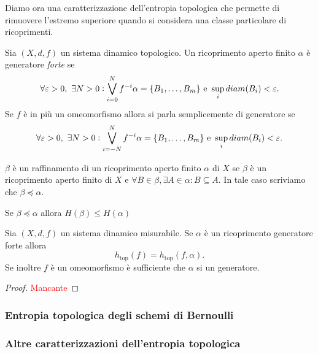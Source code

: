 Diamo ora una caratterizzazione dell'entropia topologica che permette di rimuovere l'estremo superiore quando si considera una classe particolare di ricoprimenti.

\begin{definition}[generatore]
    Sia $ (X, d, f) $ un sistema dinamico topologico. Un ricoprimento aperto finito $ \alpha $ è generatore \emph{forte} se
    \[
        \forall \varepsilon > 0, \ \exists N > 0 : \bigvee_{i=0}^{N}f^{-i}\alpha = \{B_1, \ldots, B_m\} \text{ e } \sup_{i} diam{(B_i)} < \varepsilon.
    \]
    Se $ f $ è in più un omeomorfismo allora si parla semplicemente di generatore se
    \[
        \forall \varepsilon > 0, \ \exists N > 0 : \bigvee_{i=-N}^{N}f^{-i}\alpha = \{B_1, \ldots, B_m\} \text{ e } \sup_{i} diam{(B_i)} < \varepsilon.
    \]
\end{definition}

\begin{definition}[raffinamento]
    $ \beta $ è un raffinamento di un ricoprimento aperto finito $ \alpha $ di $ X $ se $ \beta $ è un ricoprimento aperto finito di $ X $ e $ \forall B \in \beta, \exists A \in \alpha : B \subseteq A $. In tale caso scriviamo che $ \beta \preceq \alpha $.
\end{definition}

\begin{exercise}
    Se $ \beta \preceq \alpha $ allora $ H(\beta) \leq H(\alpha) $
\end{exercise}

\begin{thm}
    Sia $ (X, d, f) $ un sistema dinamico misurabile. Se $ \alpha $ è un ricoprimento generatore forte allora
    \[
        h_{\mathrm{top}}(f) = h_{\mathrm{top}}(f, \alpha).
    \]
    Se inoltre $ f $ è un omeomorfismo è sufficiente che $ \alpha $ si un generatore.
\end{thm}
\begin{proof}
    \textcolor{red}{Mancante}
\end{proof}

\subsubsection{Entropia topologica degli schemi di Bernoulli}

\subsubsection{Altre caratterizzazioni dell'entropia topologica}
